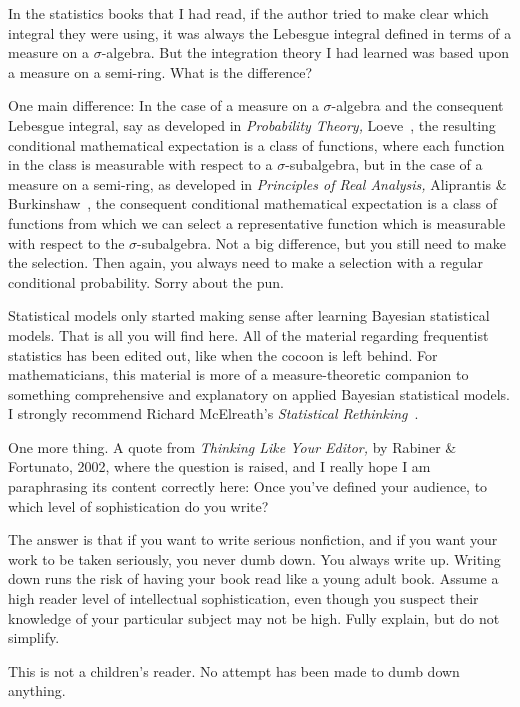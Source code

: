 \documentclass[
twoside=true,
paper=letter,
fontsize=9pt,
pagesize=auto,
leqno,
openany,
headsepline,
overfullrule,
]{scrbook}
\theoremstyle{plain}
\theoremstyle{plain}
\theoremstyle{definition}
\theoremstyle{bfnoteitalic}
\theoremstyle{bfnoteroman}
\newcommand{\textsigma}{\hbox{\large{$\sigma$}}\kern-1pt}
\begin{document}
In the statistics books that I had read, if the author tried to make clear which integral they were using, it was always the Lebesgue integral defined in terms of a measure on a  \textsigma\hyp{}algebra.
But the integration theory I had learned was based upon a measure on a  semi-ring.
What is the
difference?

One main
difference:
In the case of a measure on a  \textsigma\hyp{}algebra and the consequent Lebesgue integral, say as developed in \textsl{Probability Theory,} Loeve~\cite{pt_loeve_1960}, the resulting conditional mathematical expectation is a class of functions, where each function in the class is measurable with respect to a
\textsigma\hyp{}subalgebra, but in the case of a measure on a semi-ring, as developed in
\textsl{Principles of Real Analysis,} Aliprantis \& Burkinshaw~\cite{pora_aliprantis_1990}, the consequent conditional mathematical expectation is a class of functions from which we can select a representative function which is measurable with respect to the  \textsigma\hyp{}subalgebra.  Not a big
difference,
but you still need to make the selection. Then again, you always need to make a selection with a regular conditional probability. Sorry about the pun.





Statistical models only started making sense after learning Bayesian statistical models.  That is all you will find here. All of the material regarding frequentist statistics has been edited out, like when the cocoon is left behind.
For mathematicians, this material is more of a measure-theoretic companion to something  comprehensive and explanatory on applied Bayesian statistical models.  I strongly recommend Richard McElreath's \textsl{Statistical Rethinking}~\cite{sr_mcelreath_2020}.


One more thing.
A quote from \textsl{Thinking Like Your Editor,} by Rabiner \& Fortunato, 2002, where the question is raised, and I really hope I am paraphrasing its content correctly here: Once you've defined your audience, to which level of sophistication do you write?
\begin{quoting}\small
The answer is that if you want to write serious nonfiction, and if you want your work to be taken seriously, you never dumb down. You always write up. Writing down runs the risk of having your book read like a young adult book. Assume a high reader level of intellectual sophistication, even though you suspect their knowledge of your particular subject may not be high.  Fully explain, but do not simplify.
\end{quoting}
This is not a children's reader.
No attempt has been made to dumb down anything.
\end{document}
